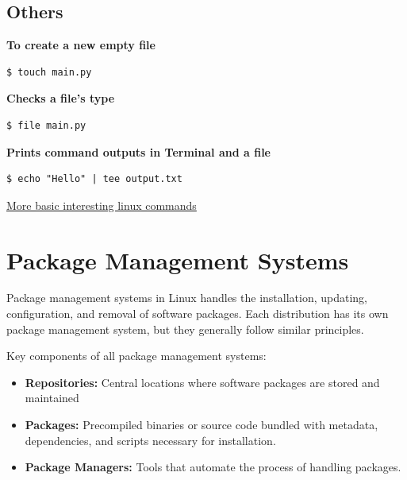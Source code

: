 \documentclass{article}
\newenvironment{codetemplate}[1][]{%
  \mybasecolorbox[#1]
  \itshape
}{%
  \endmybasecolorbox
}
\begin{document}
\subsection{Others}
\textbf{To create a new empty file}
\begin{codetemplate}{}
\begin{verbatim}
$ touch main.py
\end{verbatim}
\end{codetemplate}

\textbf{Checks a file's type}
\begin{codetemplate}{}
\begin{verbatim}
$ file main.py
\end{verbatim}
\end{codetemplate}

\textbf{Prints command outputs in Terminal and a file}
\begin{codetemplate}{}
\begin{verbatim}
$ echo "Hello" | tee output.txt
\end{verbatim}
\end{codetemplate}

\href{https://www.hostinger.com/tutorials/linux-commands}{More basic interesting linux commands}

\newpage
\section{Package Management Systems}

Package management systems in Linux handles the installation, updating, configuration, and removal of software packages. Each distribution has its own package management system, but they generally follow similar principles.

Key components of all package management systems:

\begin{itemize}
    \item \textbf{Repositories:} Central locations where software packages are stored and maintained
    \item \textbf{Packages:} Precompiled binaries or source code bundled with metadata, dependencies, and scripts necessary for installation.
    \item \textbf{Package Managers:} Tools that automate the process of handling packages.
\end{itemize}
\end{document}
